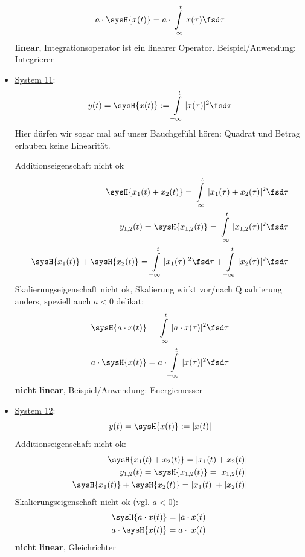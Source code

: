 \begin{Loesung}
\begin{itemize}
\begin{align}
a \cdot \sysH{x(t)}= a \cdot \int\limits_{-\infty}^{t} x(\tau) \fsd \tau
\end{align}
\textbf{linear}, Integrationsoperator ist ein linearer Operator.
Beispiel/Anwendung: Integrierer
\item  \underline{System 11}:
\begin{equation}
y(t) = \sysH{x(t)}:= \int\limits_{-\infty}^{t} |x(\tau)|^2 \fsd \tau
\end{equation}
Hier dürfen wir sogar mal auf unser Bauchgefühl hören: Quadrat und Betrag erlauben
keine Linearität.

Additionseigenschaft nicht ok
\begin{align}
\sysH{x_1(t)+x_2(t)}= \int\limits_{-\infty}^{t} |x_1(\tau)+x_2(\tau)|^2 \fsd \tau\\
y_{1,2}(t) = \sysH{x_{1,2}(t)}= \int\limits_{-\infty}^{t} |x_{1,2}(\tau)|^2 \fsd \tau\\
\sysH{x_1(t)} + \sysH{x_2(t)} = \int\limits_{-\infty}^{t} |x_{1}(\tau)|^2 \fsd \tau+\int\limits_{-\infty}^{t} |x_{2}(\tau)|^2 \fsd \tau
\end{align}
Skalierungseigenschaft nicht ok, Skalierung wirkt vor/nach Quadrierung anders,
speziell auch $a<0$ delikat:
\begin{align}
\sysH{a \cdot x(t)}= \int\limits_{-\infty}^{t} |a \cdot x(\tau)|^2 \fsd \tau\\
a \cdot \sysH{x(t)}= a\cdot \int\limits_{-\infty}^{t} |x(\tau)|^2 \fsd \tau
\end{align}
\textbf{nicht linear}, Beispiel/Anwendung: Energiemesser
\item  \underline{System 12}:
\begin{equation}
y(t) = \sysH{x(t)}:= |x(t)|
\end{equation}
Additionseigenschaft nicht ok:
\begin{align}
\sysH{x_1(t)+x_2(t)}= |x_1(t) + x_2(t)|\\
y_{1,2}(t) = \sysH{x_{1,2}(t)}= |x_{1,2}(t)|\\
\sysH{x_1(t)} + \sysH{x_2(t)} = |x_1(t)| + |x_2(t)|
\end{align}
Skalierungseigenschaft nicht ok (vgl. $a<0$):
\begin{align}
\sysH{a \cdot x(t)}= |a \cdot x(t)|\\
a \cdot \sysH{x(t)}= a \cdot |x(t)|
\end{align}
\textbf{nicht linear}, Gleichrichter


\end{itemize}
\end{Loesung}
